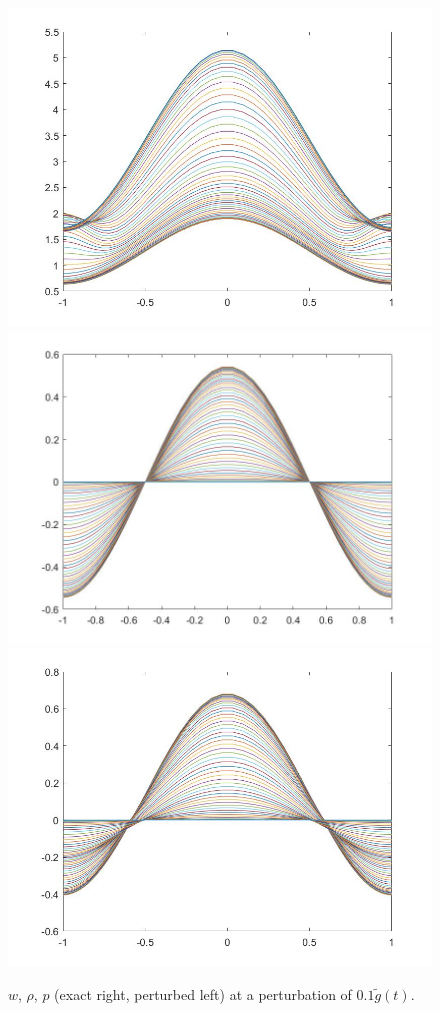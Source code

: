 \documentclass[11pt, a4paper]{article}
\theoremstyle{definition}
\begin{document}
\begin{figure}[h]
	\includegraphics[scale=0.3]{Nexprho2a.jpg}
	\includegraphics[scale=0.3]{Nexpp1a.jpg}
	\includegraphics[scale=0.3]{Nexpp2a.jpg}
	\caption{$w$, $\rho$, $p$ (exact right, perturbed left) at a perturbation of $0.1 \tilde g(t)$.}
	\label{Nexperr2}
\end{figure}
\end{document}

